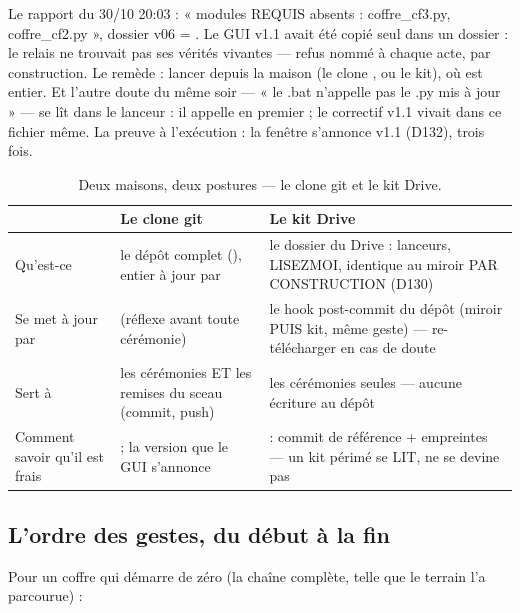 \begin{terrain}
Le rapport du 30/10 20:03 : « modules REQUIS absents : coffre\_cf3.py,
coffre\_cf2.py », dossier v06 = . Le GUI v1.1 avait été copié seul dans un dossier : le relais ne trouvait
pas ses vérités vivantes — refus nommé à chaque acte, par construction. Le remède :
lancer depuis la maison (le clone , ou le kit), où
 est entier. Et l'autre doute du même soir — « le .bat
n'appelle pas le .py mis à jour » — se lît dans le lanceur : il appelle
 en premier ; le correctif v1.1 vivait
dans ce fichier même. La preuve à l'exécution : la fenêtre s'annonce v1.1 (D132),
trois fois.
\end{terrain}

\begin{table}[htbp]
\centering\small
\caption{Deux maisons, deux postures — le clone git et le kit Drive.}
\label{tab:maisons}
\begin{tabularx}{\textwidth}{@{}l Y Y@{}}
\toprule
 & \textbf{Le clone git} & \textbf{Le kit Drive} \\
\midrule
Qu'est-ce & le dépôt complet (),  entier à
jour par  & le dossier  du Drive : lanceurs,
LISEZMOI,  identique au miroir PAR CONSTRUCTION (D130) \\
Se met à jour par &  (réflexe avant toute cérémonie) & le hook
post-commit du dépôt (miroir PUIS kit, même geste) — re-télécharger en cas de doute \\
Sert à & les cérémonies ET les remises du sceau (commit, push) & les cérémonies
seules — aucune écriture au dépôt \\
Comment savoir qu'il est frais &  ; la version que le GUI s'annonce &
 : commit de référence + empreintes — un kit périmé se LIT, ne
se devine pas \\
\bottomrule
\end{tabularx}
\end{table}

\subsection{L'ordre des gestes, du début à la fin}\label{sec:ordre}

Pour un coffre qui démarre de zéro (la chaîne complète, telle que le terrain l'a
parcourue) :


